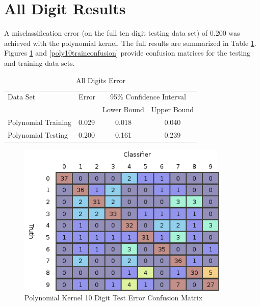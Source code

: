 \documentclass{article}
\begin{document}
\section{All Digit Results}\label{ResultsAll}

A misclassification error (on the full ten digit testing data set) of \(0.200\) was achieved with the polynomial kernel. The full results are summarized in Table \ref{error2}. Figures \ref{poly10testconfusion} and \ref{poly10trainconfusion} provide confusion matrices for the testing and training data sets.

\begin{table}
\caption{All Digits Error}
\begin{center}
\begin{tabular}{llcc}
\toprule
Data Set & Error & \multicolumn{2}{c}{95\% Confidence Interval} \\
\cmidrule(r){3-4}
& & Lower Bound & Upper Bound \\
\midrule
Polynomial Training & 0.029 & 0.018 & 0.040 \\
Polynomial Testing & 0.200 & 0.161 & 0.239 \\
\bottomrule
\end{tabular}
\label{error2}
\end{center}
\end{table}

\begin{figure}
\centering
\includegraphics[width=0.9\textwidth]{images/poly_all_confusion_test.png}
\caption{Polynomial Kernel 10 Digit Test Error Confusion Matrix}
\label{poly10testconfusion}
\end{figure}
\end{document}
